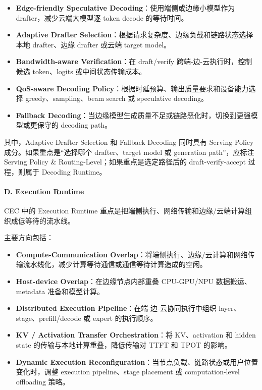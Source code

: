 \documentclass[a4paper,twocolumn,10pt]{ctexart}
\begin{document}
\begin{itemize}
\item \textbf{Edge-friendly Speculative Decoding}：使用端侧或边缘小模型作为 drafter，减少云端大模型逐 token decode 的等待时间。

\item \textbf{Adaptive Drafter Selection}：根据请求复杂度、边缘负载和链路状态选择本地 drafter、边缘 drafter 或云端 target model。

\item \textbf{Bandwidth-aware Verification}：在 draft/verify 跨端-边-云执行时，控制候选 token、logits 或中间状态传输成本。

\item \textbf{QoS-aware Decoding Policy}：根据时延预算、输出质量要求和设备能力选择 greedy、sampling、beam search 或 speculative decoding。

\item \textbf{Fallback Decoding}：当边缘模型生成质量不足或链路恶化时，切换到更强模型或更保守的 decoding path。



\end{itemize}
其中，Adaptive Drafter Selection 和 Fallback Decoding 同时具有 Serving Policy 成分。如果重点是“选择哪个 drafter、target model 或 generation path”，应标注 Serving Policy \& Routing-Level；如果重点是选定路径后的 draft-verify-accept 过程，则属于 Decoding Runtime。




\paragraph*{D. Execution Runtime}



CEC 中的 Execution Runtime 重点是把端侧执行、网络传输和边缘/云端计算组织成低等待的流水线。




主要方向包括：




\begin{itemize}
\item \textbf{Compute-Communication Overlap}：将端侧执行、边缘/云计算和网络传输流水线化，减少计算等待通信或通信等待计算造成的空闲。

\item \textbf{Host-device Overlap}：在边缘节点内部重叠 CPU-GPU/NPU 数据搬运、metadata 准备和模型计算。

\item \textbf{Distributed Execution Pipeline}：在端-边-云协同执行中组织 layer、stage、prefill/decode 或 expert 的执行顺序。

\item \textbf{KV / Activation Transfer Orchestration}：将 KV、activation 和 hidden state 的传输与本地计算重叠，降低传输对 TTFT 和 TPOT 的影响。

\item \textbf{Dynamic Execution Reconfiguration}：当节点负载、链路状态或用户位置变化时，调整 execution pipeline、stage placement 或 computation-level offloading 策略。



\end{itemize}
\end{document}
